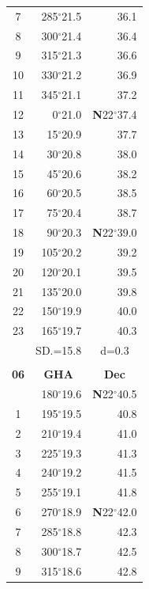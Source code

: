 \documentclass[10pt, a4paper]{report}
\begin{document}
\begin{scriptsize}
\begin{tabular*}{0.2\textwidth}[t]{@{\extracolsep{\fill}}|c|rr|}
7 & 285$^\circ$21.5 & 36.1\\
8 & 300$^\circ$21.4 & 36.4\\
9 & 315$^\circ$21.3 & \raisebox{0.24ex}{\boldmath$\cdot$~\boldmath$\cdot$~~}36.6\\
10 & 330$^\circ$21.2 & 36.9\\
11 & 345$^\circ$21.1 & 37.2\\[2Pt]
12 & 0$^\circ$21.0 & \textbf{N}22$^\circ$37.4\\
13 & 15$^\circ$20.9 & 37.7\\
14 & 30$^\circ$20.8 & 38.0\\
15 & 45$^\circ$20.6 & \raisebox{0.24ex}{\boldmath$\cdot$~\boldmath$\cdot$~~}38.2\\
16 & 60$^\circ$20.5 & 38.5\\
17 & 75$^\circ$20.4 & 38.7\\[2Pt]
18 & 90$^\circ$20.3 & \textbf{N}22$^\circ$39.0\\
19 & 105$^\circ$20.2 & 39.2\\
20 & 120$^\circ$20.1 & 39.5\\
21 & 135$^\circ$20.0 & \raisebox{0.24ex}{\boldmath$\cdot$~\boldmath$\cdot$~~}39.8\\
22 & 150$^\circ$19.9 & 40.0\\
23 & 165$^\circ$19.7 & 40.3\\
\hline
\rule{0pt}{2.4ex} & \multicolumn{1}{c}{SD.=15.8} & \multicolumn{1}{c|}{d=0.3}\\
\hline
\multicolumn{1}{c}{}\\[-0.5ex]\hline
\multicolumn{1}{|c|}{\rule{0pt}{2.6ex}\textbf{06}} & \multicolumn{1}{c}{\textbf{GHA}} & \multicolumn{1}{c|}{\textbf{Dec}}\\
\hline\rule{0pt}{2.6ex}\noindent
0 & 180$^\circ$19.6 & \textbf{N}22$^\circ$40.5\\
1 & 195$^\circ$19.5 & 40.8\\
2 & 210$^\circ$19.4 & 41.0\\
3 & 225$^\circ$19.3 & \raisebox{0.24ex}{\boldmath$\cdot$~\boldmath$\cdot$~~}41.3\\
4 & 240$^\circ$19.2 & 41.5\\
5 & 255$^\circ$19.1 & 41.8\\[2Pt]
6 & 270$^\circ$18.9 & \textbf{N}22$^\circ$42.0\\
7 & 285$^\circ$18.8 & 42.3\\
8 & 300$^\circ$18.7 & 42.5\\
9 & 315$^\circ$18.6 & \raisebox{0.24ex}{\boldmath$\cdot$~\boldmath$\cdot$~~}42.8\\

\end{tabular*}
\end{scriptsize}
\end{document}
